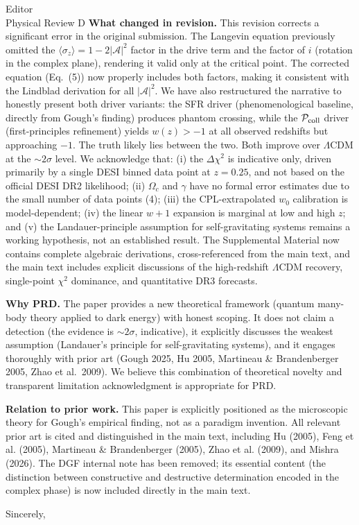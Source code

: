 \documentclass[12pt]{letter}
\begin{document}
\begin{letter}{Editor\\Physical Review D}
\textbf{What changed in revision.} This revision corrects a significant error in the original submission. The Langevin equation previously omitted the $\langle\sigma_z\rangle = 1-2|\mathcal{A}|^2$ factor in the drive term and the factor of $i$ (rotation in the complex plane), rendering it valid only at the critical point. The corrected equation (Eq.~(5)) now properly includes both factors, making it consistent with the Lindblad derivation for all $|\mathcal{A}|^2$. We have also restructured the narrative to honestly present both driver variants: the SFR driver (phenomenological baseline, directly from Gough's finding) produces phantom crossing, while the $\mathcal{P}_{\rm coll}$ driver (first-principles refinement) yields $w(z) > -1$ at all observed redshifts but approaching $-1$. The truth likely lies between the two. Both improve over $\Lambda$CDM at the $\sim 2\sigma$ level. We acknowledge that: (i) the $\Delta\chi^2$ is indicative only, driven primarily by a single DESI binned data point at $z=0.25$, and not based on the official DESI DR2 likelihood; (ii) $\Omega_c$ and $\gamma$ have no formal error estimates due to the small number of data points (4); (iii) the CPL-extrapolated $w_0$ calibration is model-dependent; (iv) the linear $w+1$ expansion is marginal at low and high $z$; and (v) the Landauer-principle assumption for self-gravitating systems remains a working hypothesis, not an established result. The Supplemental Material now contains complete algebraic derivations, cross-referenced from the main text, and the main text includes explicit discussions of the high-redshift $\Lambda$CDM recovery, single-point $\chi^2$ dominance, and quantitative DR3 forecasts.

\textbf{Why PRD.} The paper provides a new theoretical framework (quantum many-body theory applied to dark energy) with honest scoping. It does not claim a detection (the evidence is $\sim 2\sigma$, indicative), it explicitly discusses the weakest assumption (Landauer's principle for self-gravitating systems), and it engages thoroughly with prior art (Gough 2025, Hu 2005, Martineau \& Brandenberger 2005, Zhao et al.\ 2009). We believe this combination of theoretical novelty and transparent limitation acknowledgment is appropriate for PRD.

\textbf{Relation to prior work.} This paper is explicitly positioned as the microscopic theory for Gough's empirical finding, not as a paradigm invention. All relevant prior art is cited and distinguished in the main text, including Hu (2005), Feng et al. (2005), Martineau \& Brandenberger (2005), Zhao et al. (2009), and Mishra (2026). The DGF internal note has been removed; its essential content (the distinction between constructive and destructive determination encoded in the complex phase) is now included directly in the main text.

\closing{Sincerely,}

\end{letter}
\end{document}
